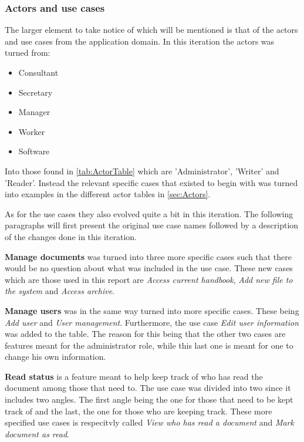\subsubsection*{Actors and use cases}
The larger element to take notice of which will be mentioned is that of the actors and use cases from the application domain.
In this iteration the actors was turned from:
\begin{itemize}
	\item
	Consultant
	\item
	Secretary
	\item
	Manager
	\item
	Worker
	\item
	Software
\end{itemize}
Into those found in \cref{tab:ActorTable} which are 'Administrator', 'Writer' and 'Reader'.
Instead the relevant specific cases that existed to begin with was turned into examples in the different actor tables in \cref{sec:Actors}.

As for the use cases they also evolved quite a bit in this iteration.
The following paragraphs will first present the original use case names followed by a description of the changes done in this iteration.

\textbf{Manage documents} was turned into three more specific cases such that there would be no question about what was included in the use case.
These new cases which are those used in this report are \textit{Access current handbook}, \textit{Add new file to the system} and \textit{Access archive}.

\textbf{Manage users} was in the same way turned into more specific cases.
These being \textit{Add user} and \textit{User management}.
Furthermore, the use case \textit{Edit user information} was added to the table.
The reason for this being that the other two cases are features meant for the administrator role, while this last one is meant for one to change his own information.

\textbf{Read status} is a feature meant to help keep track of who has read the document among those that need to.
The use case was divided into two since it includes two angles.
The first angle being the one for those that need to be kept track of and the last, the one for those who are keeping track.
These more specified use cases is respecitvly called \textit{View who has read a document} and \textit{Mark document as read}.

